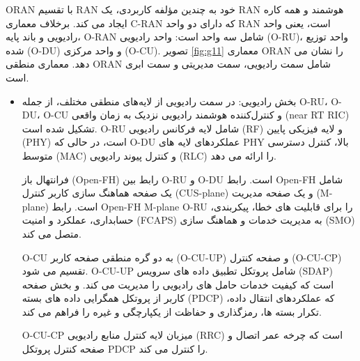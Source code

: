 ORAN با تقسیم RAN خود به چندین مؤلفه کاربردی، یک RAN هوشمند و همه کاره ایجاد می کند.
برخلاف معماری C-RAN که دارای دو واحد RAN است، یعنی واحد رادیویی و باند پایه، O-RAN شامل سه واحد است: واحد رادیویی (O-RU)، واحد توزیع شده (O-DU) و واحد مرکزی (O-CU).
تصویر \ref{fig:g11} معماری ORAN را نشان می دهد.
معماری منطقی ORAN شامل سمت رادیویی، سمت مدیریتی و سمت ابری است.
\begin{itemize}
	\item بخش رادیویی:
	در سمت رادیویی از لایه‌های منطقی مختلف، از جمله 
	O-RU، O-DU، O-CU  
	و
	کنترل‌کننده هوشمند رادیویی نزدیک به زمان واقعی (near RT RIC) تشکیل شده است.
O-RU شامل لایه فرکانس رادیویی (RF) و لایه فیزیکی پایین (PHY) است، در حالی که O-DU عملکردهای لایه های PHY بالا، کنترل دسترسی متوسط (MAC) و کنترل پیوند رادیویی (RLC) را ارائه می دهد.

فرانتهال باز (Open-FH) رابط بین O-RU و O-DU است. رابط Open-FH شامل یک صفحه هماهنگ سازی کاربر کنترل (CUS-plane) و یک صفحه مدیریت (M-plane) است. رابط Open-FH M-plane O-RU را برای قابلیت های خطا، پیکربندی، حسابداری، عملکرد و امنیت (FCAPS) به مدیریت خدمات و هماهنگ سازی (SMO) متصل می کند.	

O-CU به دو گره منطقی صفحه کاربر (O-CU-UP) و صفحه کنترل (O-CU-CP) تقسیم می شود. O-CU-UP شامل پروتکل تطبیق داده های سرویس (SDAP) است که کیفیت خدمات حامل های رادیویی را مدیریت می کند. و بخش صفحه کاربر از پروتکل همگرایی داده های بسته (PDCP) که عملکردهای انتقال داده، تکرار بسته ها، رمزگذاری و حفاظت از یکپارچگی و غیره را فراهم می کند.

O-CU-CP میزبان لایه کنترل منابع رادیویی (RRC) است که چرخه عمر اتصال و صفحه کنترل پروتکل PDCP را کنترل می کند.


\end{itemize}
